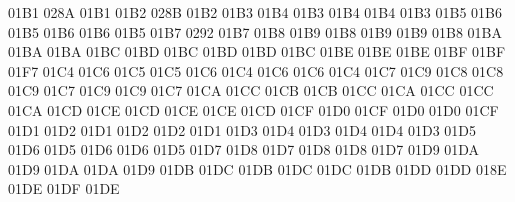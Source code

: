 \setcclcucx 01B1 028A 01B1 %
\setcclcucx 01B2 028B 01B2 %
\setcclcucx 01B3 01B4 01B3 %
\setcclcucx 01B4 01B4 01B3 %
\setcclcucx 01B5 01B6 01B5 %
\setcclcucx 01B6 01B6 01B5 %
\setcclcucx 01B7 0292 01B7 %
\setcclcucx 01B8 01B9 01B8 %
\setcclcucx 01B9 01B9 01B8 %
\setcclcucx 01BA 01BA 01BA %
\setcclcucx 01BC 01BD 01BC %
\setcclcucx 01BD 01BD 01BC %
\setcclcucx 01BE 01BE 01BE %
\setcclcucx 01BF 01BF 01F7 %
\setcclcucx 01C4 01C6 01C5 %
\setcclcucx 01C5 01C6 01C4 %
\setcclcucx 01C6 01C6 01C4 %
\setcclcucx 01C7 01C9 01C8 %
\setcclcucx 01C8 01C9 01C7 %
\setcclcucx 01C9 01C9 01C7 %
\setcclcucx 01CA 01CC 01CB %
\setcclcucx 01CB 01CC 01CA %
\setcclcucx 01CC 01CC 01CA %
\setcclcucx 01CD 01CE 01CD %
\setcclcucx 01CE 01CE 01CD %
\setcclcucx 01CF 01D0 01CF %
\setcclcucx 01D0 01D0 01CF %
\setcclcucx 01D1 01D2 01D1 %
\setcclcucx 01D2 01D2 01D1 %
\setcclcucx 01D3 01D4 01D3 %
\setcclcucx 01D4 01D4 01D3 %
\setcclcucx 01D5 01D6 01D5 %
\setcclcucx 01D6 01D6 01D5 %
\setcclcucx 01D7 01D8 01D7 %
\setcclcucx 01D8 01D8 01D7 %
\setcclcucx 01D9 01DA 01D9 %
\setcclcucx 01DA 01DA 01D9 %
\setcclcucx 01DB 01DC 01DB %
\setcclcucx 01DC 01DC 01DB %
\setcclcucx 01DD 01DD 018E %
\setcclcucx 01DE 01DF 01DE %
